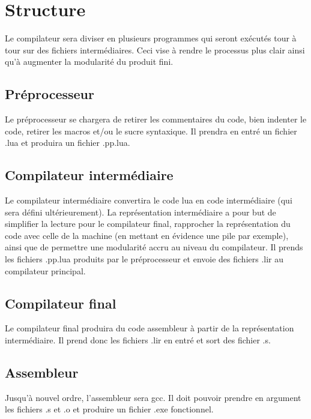 \documentclass{article}
\begin{document}
\section{Structure}
Le compilateur sera diviser en plusieurs programmes qui seront exécutés tour à tour sur des fichiers intermédiaires. Ceci vise à rendre le processus plus clair ainsi qu'à augmenter la modularité du produit fini.

\subsection{Préprocesseur}
Le préprocesseur se chargera de retirer les commentaires du code, bien indenter le code, retirer les macros et/ou le sucre syntaxique. Il prendra en entré un fichier .lua et produira un fichier .pp.lua.

\subsection{Compilateur intermédiaire}
Le compilateur intermédiaire convertira le code lua en code intermédiaire (qui sera défini ultérieurement). La représentation intermédiaire a pour but de simplifier la lecture pour le compilateur final, rapprocher la représentation du code avec celle de la machine (en mettant en évidence une pile par exemple), ainsi que de permettre une modularité accru au niveau du compilateur. Il prends les fichiers .pp.lua produits par le préprocesseur et envoie des fichiers .lir au compilateur principal.

\subsection{Compilateur final}
Le compilateur final produira du code assembleur à partir de la représentation intermédiaire. Il prend donc les fichiers .lir en entré et sort des fichier .s.

\subsection{Assembleur}
Jusqu'à nouvel ordre, l'assembleur sera gcc. Il doit pouvoir prendre en argument les fichiers .s et .o et produire un fichier .exe fonctionnel.
\end{document}
